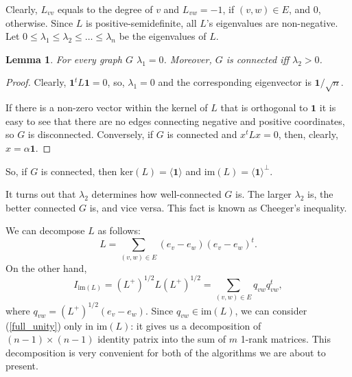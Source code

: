 \documentclass[12pt]{article}
\newtheorem{lemma}{Lemma}
\begin{document}
    Clearly, $L_{vv}$ equals to the degree of $v$ and $L_{vw} = -1$, if $(v, w) \in E$,
    and $0$, otherwise.
    Since $L$ is positive-semidefinite, all $L$'s eigenvalues are non-negative. Let
    $0 \leq \lambda_1 \leq \lambda_2 \leq \ldots \leq \lambda_n$ be the eigenvalues of $L$.

    \begin{lemma}
        For every graph $G$ $\lambda_1 = 0$. Moreover, $G$ is connected iff $\lambda_2 > 0$.
    \end{lemma}
    \begin{proof}
        Clearly, $\mathbf{1}^t L \mathbf{1} = 0$, so, $\lambda_1 = 0$ and the corresponding
        eigenvector is $\mathbf{1} / \sqrt{n}$.

        If there is a non-zero
        vector within the kernel of $L$ that is orthogonal to $\mathbf{1}$
        it is easy to see that there are no edges connecting negative and positive
        coordinates, so $G$ is disconnected. Conversely, if $G$ is connected and
        $x^t L x = 0$, then, clearly, $x = \alpha \mathbf{1}$.
    \end{proof}

    So, if $G$ is connected, then $\mathrm{ker}(L) = \langle \mathbf{1} \rangle$
    and $\mathrm{im}(L) = \langle \mathbf{1} \rangle^{\perp}$.

    It turns out that $\lambda_2$ determines how well-connected $G$ is. The larger
    $\lambda_2$ is, the better connected $G$ is, and vice versa. This fact is known
    as Cheeger's inequality.

    We can decompose $L$ as follows:
    $$
        L = \sum_{(v,w) \in E} (e_v - e_w) (e_v - e_w)^t.
    $$
    On the other hand,
    \begin{equation}
        \label{full_unity}
        I_{\mathrm{im}(L)} = (L^+)^{1/2} L (L^+)^{1/2} = \sum_{(v,w) \in E} q_{vw} q_{vw}^t,
    \end{equation}
    where $q_{vw} = (L^+)^{1/2} (e_v - e_w)$. Since $q_{vw} \in \mathrm{im}(L)$, we can
    consider (\ref{full_unity}) only in $\mathrm{im}(L)$: it gives us a decomposition of
    $(n-1)\times(n-1)$ identity patrix into the sum of $m$ 1-rank matrices.
    This decomposition is very convenient for both of the algorithms we are about to
    present.
\end{document}
